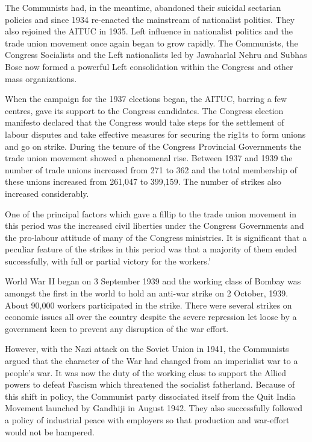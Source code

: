 The Communists had, in the meantime, abandoned their suicidal sectarian policies and since 1934 re-enacted the mainstream of nationalist politics. They also rejoined the AITUC in 1935. Left influence in nationalist politics and the trade union movement once again began to grow rapidly. The Communists, the Congress Socialists and the Left nationalists led by Jawaharlal Nehru and Subhas Bose now formed a powerful Left consolidation within the Congress and other mass organizations.

When the campaign for the 1937 elections began, the AITUC, barring a few centres, gave its support to the Congress candidates. The Congress election manifesto declared that the Congress would take steps for the settlement of labour disputes and take effective measures for securing the rig1ts to form unions and go on strike. During the tenure of the Congress Provincial Governments the trade union movement showed a phenomenal rise. Between 1937 and 1939 the number of trade unions increased from 271 to 362 and the total membership of these unions increased from 261,047 to 399,159. The number of strikes also increased considerably.

One of the principal factors which gave a fillip to the trade union movement in this period was the increased civil liberties under the Congress Governments and the pro-labour attitude of many of the Congress ministries. It is significant that a peculiar feature of the strikes in this period was that a majority of them ended successfully, with full or partial victory for the workers.’

World War II began on 3 September 1939 and the working class of Bombay was amongst the first in the world to hold an anti-war strike on 2 October, 1939. About 90,000 workers participated in the strike. There were several strikes on economic issues all over the country despite the severe repression let loose by a government keen to prevent any disruption of the war effort.

However, with the Nazi attack on the Soviet Union in 1941, the Communists argued that the character of the War had changed from an imperialist war to a people’s war. It was now the duty of the working class to support the Allied powers to defeat Fascism which threatened the socialist fatherland. Because of this shift in policy, the Communist party dissociated itself from the Quit India Movement launched by Gandhiji in August 1942. They also successfully followed a policy of industrial peace with employers so that production and war-effort would not be hampered.

